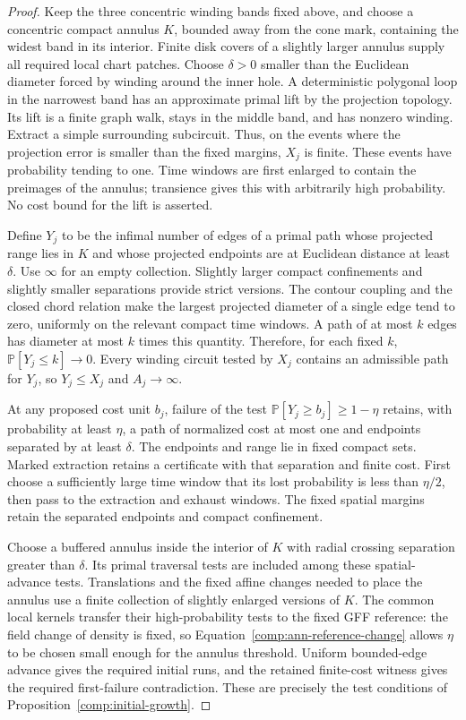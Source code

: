 \begin{proof}
Keep the three concentric winding bands fixed above, and choose a
concentric compact annulus $K$, bounded away from the cone mark,
containing the widest band in its interior.  Finite disk covers of a
slightly larger annulus supply all required local chart patches.  Choose
$\delta>0$ smaller than the Euclidean diameter forced by winding
around the inner hole.  A deterministic polygonal loop in the
narrowest band has an approximate primal lift by the projection
topology.  Its lift is a finite graph walk, stays in the middle band,
and has nonzero winding.  Extract a simple surrounding subcircuit.
Thus, on the events where the projection error is smaller than the
fixed margins, $X_j$ is finite.  These events have probability tending
to one.  Time windows are first enlarged to contain the preimages of
the annulus; transience gives this with arbitrarily high probability.
No cost bound for the lift is asserted.

Define $Y_j$ to be the infimal number of edges of a primal path whose
projected range lies in $K$ and whose projected endpoints are at
Euclidean distance at least $\delta$.  Use $\infty$ for an empty
collection.  Slightly larger compact confinements and slightly smaller
separations provide strict versions.  The contour coupling and the
closed chord relation make the largest projected diameter of a single
edge tend to zero, uniformly on the relevant compact time windows.
A path of at most $k$ edges has diameter at most $k$ times this
quantity.  Therefore, for each fixed $k$,
$\mathbb P[Y_j\le k]\to0$.  Every winding circuit tested by $X_j$
contains an admissible path for $Y_j$, so $Y_j\le X_j$ and
$A_j\to\infty$.

At any proposed cost unit $b_j$, failure of the test
$\mathbb P[Y_j\ge b_j]\ge1-\eta$ retains, with probability at
least $\eta$, a path of normalized cost at most one and endpoints
separated by at least $\delta$.  The endpoints and range lie in fixed
compact sets.  Marked extraction retains a certificate with that
separation and finite cost.  First choose a sufficiently large time
window that its lost probability is less than $\eta/2$, then pass to
the extraction and exhaust windows.  The fixed spatial margins retain
the separated endpoints and compact confinement.

Choose a buffered annulus inside the interior of $K$ with radial
crossing separation greater than $\delta$.  Its primal traversal
tests are included among these spatial-advance tests.  Translations
and the fixed affine changes needed to place the annulus use a finite
collection of slightly enlarged versions of $K$.  The common local
kernels transfer their high-probability tests to the fixed GFF
reference: the field change of density is fixed, so
Equation~\eqref{comp:ann-reference-change} allows $\eta$ to be chosen
small enough for the annulus threshold.  Uniform bounded-edge advance
gives the required initial runs, and the retained finite-cost witness
gives the required first-failure contradiction.  These are precisely
the test conditions of Proposition~\ref{comp:initial-growth}.
\end{proof}



